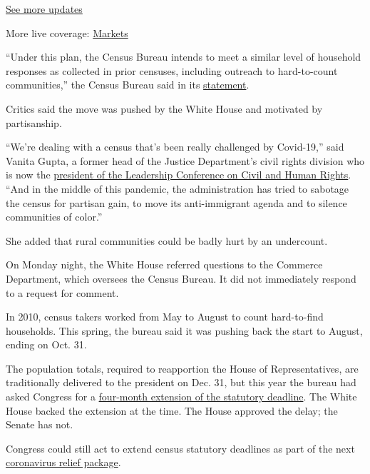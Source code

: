 \href{https://www.nytimes3xbfgragh.onion/2020/08/03/world/coronavirus-covid-19.html?action=click\&pgtype=Article\&state=default\&region=MAIN_CONTENT_1\&context=storylines_live_updates}{See
more updates}

More live coverage:
\href{https://www.nytimes3xbfgragh.onion/live/2020/08/03/business/stock-market-today-coronavirus?action=click\&pgtype=Article\&state=default\&region=MAIN_CONTENT_1\&context=storylines_live_updates}{Markets}

``Under this plan, the Census Bureau intends to meet a similar level of
household responses as collected in prior censuses, including outreach
to hard-to-count communities,'' the Census Bureau said in its
\href{https://www.census.gov/newsroom/press-releases/2020/delivering-complete-accurate-count.html}{statement}.

Critics said the move was pushed by the White House and motivated by
partisanship.

``We're dealing with a census that's been really challenged by
Covid-19,'' said Vanita Gupta, a former head of the Justice Department's
civil rights division who is now the
\href{https://civilrights.org/about/our-staff/vanita-gupta/}{president
of the Leadership Conference on Civil and Human Rights}. ``And in the
middle of this pandemic, the administration has tried to sabotage the
census for partisan gain, to move its anti-immigrant agenda and to
silence communities of color.''

She added that rural communities could be badly hurt by an undercount.

On Monday night, the White House referred questions to the Commerce
Department, which oversees the Census Bureau. It did not immediately
respond to a request for comment.

In 2010, census takers worked from May to August to count hard-to-find
households. This spring, the bureau said it was pushing back the start
to August, ending on Oct. 31.

The population totals, required to reapportion the House of
Representatives, are traditionally delivered to the president on Dec.
31, but this year the bureau had asked Congress for a
\href{https://www.nytimes3xbfgragh.onion/2020/04/13/us/census-coronavirus-delay.html?searchResultPosition=9}{four-month
extension of the statutory deadline}. The White House backed the
extension at the time. The House approved the delay; the Senate has not.

Congress could still act to extend census statutory deadlines as part of
the next
\href{https://www.nytimes3xbfgragh.onion/2020/08/02/us/politics/coronavirus-jobless-aid.html}{coronavirus
relief package}.

